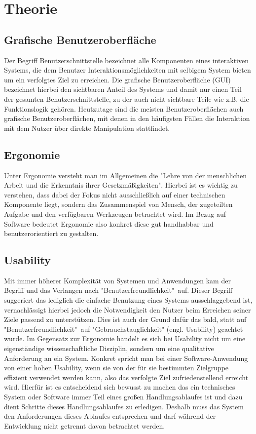 \chapter{Theorie}\label{ch:data}

\section{Grafische Benutzeroberfläche}
Der Begriff Benutzerschnittstelle bezeichnet alle Komponenten eines interaktiven Systems, die dem Benutzer Interaktionsmöglichkeiten mit selbigem System bieten um ein verfolgtes Ziel zu erreichen.
Die grafische Benutzeroberfläche (GUI) bezeichnet hierbei den sichtbaren Anteil des Systems und damit nur einen Teil der gesamten Benutzerschnittstelle, zu der auch nicht sichtbare Teile wie z.B. die Funktionslogik gehören\cite{Sarodnick.2016}.
Heutzutage sind die meisten Benutzeroberflächen auch grafische Benutzeroberflächen, mit denen in den häufigsten Fällen die Interaktion mit dem Nutzer über direkte Manipulation stattfindet\cite{Nielsen.1995?}.

\section{Ergonomie}
Unter Ergonomie versteht man im Allgemeinen die "Lehre von der menschlichen Arbeit und die Erkenntnis ihrer Gesetzmäßigkeiten"\cite{https:www.facebook.comArbeitsplatzergonomie.2014}.
Hierbei ist es wichtig zu verstehen, dass dabei der Fokus nicht ausschließlich auf einer technischen Komponente liegt, sondern das Zusammenspiel von Mensch, der zugeteilten Aufgabe und den verfügbaren Werkzeugen betrachtet wird\cite{Sarodnick.2016}.
Im Bezug auf Software bedeutet Ergonomie also konkret diese gut handhabbar und benutzerorientiert zu gestalten.

\section{Usability}
Mit immer höherer Komplexität von Systemen und Anwendungen kam der Begriff und das Verlangen nach  "Benutzerfreundlichkeit"\ auf.
Dieser Begriff suggeriert das lediglich die einfache Benutzung eines Systems ausschlaggebend ist, vernachlässigt hierbei jedoch die Notwendigkeit den Nutzer beim Erreichen seiner Ziele passend zu unterstützen.
Dies ist auch der Grund dafür das bald, statt auf "Benutzerfreundlichkeit"\ auf "Gebrauchstauglichkeit" (engl. Usability) geachtet wurde.
Im Gegensatz zur Ergonomie handelt es sich bei Usability nicht um eine eigenständige wissenschaftliche Disziplin, sondern um eine qualitative Anforderung an ein System\cite{Sarodnick.2016}.
Konkret spricht man bei einer Software-Anwendung von einer hohen Usability, wenn sie von der für sie bestimmten Zielgruppe effizient verwendet werden kann, also das verfolgte Ziel zufriedenstellend erreicht wird\cite{Richter.2016}.
Hierfür ist es entscheidend sich bewusst zu machen das ein technisches System oder Software immer Teil eines großen Handlungsablaufes ist und dazu dient Schritte dieses Handlungsablaufes zu erledigen.
Deshalb muss das System den Anforderungen dieses Ablaufes entsprechen und darf während der Entwicklung nicht getrennt davon betrachtet werden\cite{Sarodnick.2016}.

